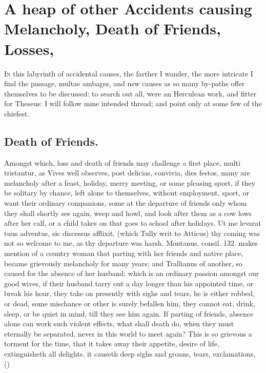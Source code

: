 {%
\section[Accidents, Death of Friends, Losses]{A heap of other Accidents causing Melancholy, Death of Friends, Losses, \etc{}}

\lettrine{I}{n} this labyrinth of accidental causes, the farther I wander, the more
intricate I find the passage, multae ambages, and new causes as so many
by-paths offer themselves to be discussed: to search out all, were an
Herculean work, and fitter for Theseus: I will follow mine intended
thread; and point only at some few of the chiefest.
\subsection{Death of Friends.}
Amongst which, loss and death of friends may
challenge a first place, multi tristantur, as Vives well
observes, post delicias, convivia, dies festos, many are melancholy
after a feast, holiday, merry meeting, or some pleasing sport, if they
be solitary by chance, left alone to themselves, without employment,
sport, or want their ordinary companions, some at the departure of
friends only whom they shall shortly see again, weep and howl, and look
after them as a cow lows after her calf, or a child takes on that goes
to school after holidays. Ut me levarat tuus adventus, sic discessus
afflixit, (which Tully writ to Atticus) thy coming was not so
welcome to me, as thy departure was harsh. Montanus, consil. 132. makes
mention of a country woman that parting with her friends and native
place, became grievously melancholy for many years; and Trallianus of
another, so caused for the absence of her husband: which is an ordinary
passion amongst our good wives, if their husband tarry out a day longer
than his appointed time, or break his hour, they take on presently with
sighs and tears, he is either robbed, or dead, some mischance or other
is surely befallen him, they cannot eat, drink, sleep, or be quiet in
mind, till they see him again. If parting of friends, absence alone can
work such violent effects, what shall death do, when they must
eternally be separated, never in this world to meet again? This is so
grievous a torment for the time, that it takes away their appetite,
desire of life, extinguisheth all delights, it causeth deep sighs and
groans, tears, exclamations,
() 
}
